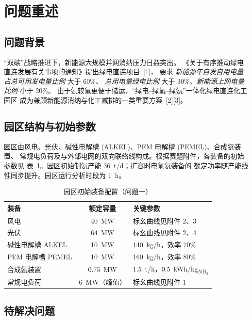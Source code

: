 \section{问题重述}

\subsection{问题背景}

``双碳''战略推进下，新能源大规模并网消纳压力日益突出。
《关于有序推动绿电直连发展有关事项的通知》提出绿电直连项目~[1]，
要求 \emph{新能源年自发自用电量占总可用发电量比例} 大于 60\%、
\emph{总用电量绿电比例} 大于 30\%、\emph{新能源上网电量比例} 小于 20\%。
由于氨较氢更便于储运，``绿电--绿氢--绿氨''一体化绿电直连化工园区
成为兼顾新能源消纳与化工减排的一类重要方案~[2][3]。

\subsection{园区结构与初始参数}

园区由风电、光伏、碱性电解槽 (ALKEL)、PEM 电解槽 (PEMEL)、合成氨装置、
常规电负荷及与外部电网的双向联络线构成。根据赛题附件，各装备的初始参数见
表~\ref{tab:plant-config}。园区初始制氨产能 36~t/d；扩容时电氢氨装备的
额定功率随产能线性同步提升。园区运行分析时段为 1~h。

\begin{table}[H]
  \centering
  \caption{园区初始装备配置（问题一）}
  \label{tab:plant-config}
  \begin{tabular}{lcl}
    \toprule
    装备 & 额定容量 & 关键参数 \\
    \midrule
    风电 & 40~MW & 标幺曲线见附件 2、3 \\
    光伏 & 64~MW & 标幺曲线见附件 2、4 \\
    碱性电解槽 ALKEL & 10~MW & 140~kg/h，效率 70\% \\
    PEM 电解槽 PEMEL & 10~MW & 160~kg/h，效率 80\% \\
    合成氨装置 & 0.75~MW & 1.5~t/h，0.5~kWh/kg\textsubscript{NH$_3$} \\
    常规电负荷 & 6~MW（峰值） & 标幺曲线见附件 1 \\
    \bottomrule
  \end{tabular}
\end{table}

\subsection{待解决问题}

